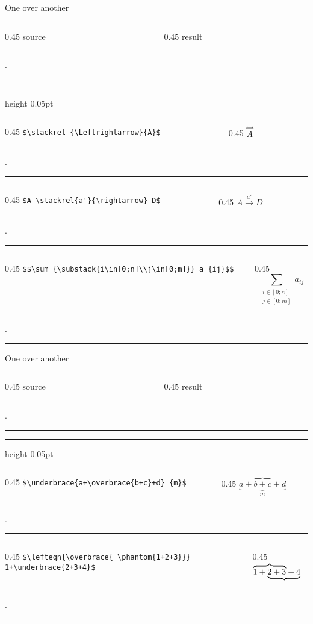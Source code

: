 \begin{frame}[fragile]{One over another\magicPage}\relax

\newcommand{\appendTline}[2]{\vspace*{10pt}\begin{columns}
        \begin{column}{0.45\textwidth}
          \hfill #1 
        \end{column}
        \begin{column}{0.45\textwidth}
             \hfill #2\hfill \hfill
        \end{column}
    \end{columns}
    \vphantom.
    \hrule
    }

    \cprotect[mm]\appendTline{\csk source}{\csk result}
    \hrule height 0.05pt
    \cprotect[mm]\appendTline{\lstinline|$\stackrel {\Leftrightarrow}{A}$|}{$\stackrel {\Leftrightarrow}{A}$}
    \cprotect[mm]\appendTline{\lstinline|$A \stackrel{a'}{\rightarrow} D$|}{$A \stackrel{a'}{\rightarrow} D$}
    \cprotect[mm]\appendTline{\lstinline|$$\sum_{\substack{i\in[0;n]\\j\in[0;m]}} a_{ij}$$|}{$$\sum_{\substack{i\in[0;n]\\j\in[0;m]}} a_{ij}$$}
    
\end{frame}

\begin{frame}[fragile]{One over another\magicPage}\relax

\newcommand{\appendTline}[2]{\vspace*{10pt}\begin{columns}
        \begin{column}{0.45\textwidth}
          \hfill #1 
        \end{column}
        \begin{column}{0.45\textwidth}
             \hfill #2\hfill \hfill
        \end{column}
    \end{columns}
    \vphantom.
    \hrule
    }

    \cprotect[mm]\appendTline{\csk source}{\csk result}
    \hrule height 0.05pt
    
    \cprotect[mm]\appendTline{\lstinline|$\underbrace{a+\overbrace{b+c}+d}_{m}$|}{$\underbrace{a+\overbrace{b+c}+d}_{m}$}
    
    \cprotect[mm]\appendTline{\lstinline|$\lefteqn{\overbrace{ \phantom{1+2+3}}} 1+\underbrace{2+3+4}$|}{$\lefteqn{\overbrace{ \phantom{1+2+3}}} 1+\underbrace{2+3+4}$}
    
\end{frame}

